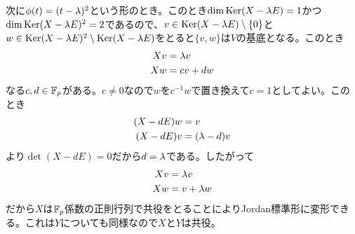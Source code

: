 \begin{sol}
\begin{description}
    次に$\phi(t) = (t - {\lambda})^2$という形のとき。このとき$\dim \operatorname{Ker} (X - {\lambda} E) = 1$かつ$\dim \operatorname{Ker} (X - {\lambda} E)^2 = 2$であるので、$v \in \operatorname{Ker} (X - {\lambda} E) \setminus \{0\}$と$w \in \operatorname{Ker} (X - {\lambda} E)^2 \setminus \operatorname{Ker} (X - {\lambda} E)$をとると$\{v , w \}$は$V$の基底となる。このとき
    \begin{align*}
      Xv &= {\lambda} v \\
      Xw &= cv + dw
    \end{align*}
    なる$c,d \in {\mathbb F}_p$がある。$c \neq 0$なので$w$を$c^{-1}w$で置き換えて$c=1$としてよい。このとき
    \begin{align*}
      (X-dE)w &=  v \\
      (X-dE)v &= ({\lambda} -d )v
    \end{align*}
    より$\det (X-dE)=0$だから$d={\lambda}$である。したがって
    \begin{align*}
      Xv &= {\lambda} v \\
      Xw &= v + {\lambda} w
    \end{align*}
    だから$X$は${\mathbb F}_p$係数の正則行列で共役をとることによりJordan標準形に変形できる。これは$Y$についても同様なので$X$と$Y$は共役。


\end{description}
\end{sol}
